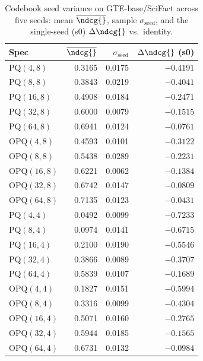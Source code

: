 \begin{table}[t]
\centering
\small
\caption{Codebook seed variance on GTE-base/SciFact across five seeds: mean $\overline{\ndcg{}}$, sample $\sigma_{\text{seed}}$, and the single-seed (s0) $\Delta\ndcg{}$ vs.\ identity.}
\label{tab:seed-variance-gte-base-scifact}
\begin{tabular}{lrrr}
\toprule
Spec & $\overline{\ndcg{}}$ & $\sigma_{\text{seed}}$ & $\Delta\ndcg{}$ (s0) \\
\midrule
PQ$(4,8)$ & 0.3165 & 0.0175 & $-0.4191$ \\
PQ$(8,8)$ & 0.3843 & 0.0219 & $-0.4041$ \\
PQ$(16,8)$ & 0.4908 & 0.0184 & $-0.2471$ \\
PQ$(32,8)$ & 0.6000 & 0.0079 & $-0.1515$ \\
PQ$(64,8)$ & 0.6941 & 0.0124 & $-0.0761$ \\
OPQ$(4,8)$ & 0.4593 & 0.0101 & $-0.3122$ \\
OPQ$(8,8)$ & 0.5438 & 0.0289 & $-0.2231$ \\
OPQ$(16,8)$ & 0.6221 & 0.0062 & $-0.1384$ \\
OPQ$(32,8)$ & 0.6742 & 0.0147 & $-0.0809$ \\
OPQ$(64,8)$ & 0.7135 & 0.0123 & $-0.0431$ \\
PQ$(4,4)$ & 0.0492 & 0.0099 & $-0.7233$ \\
PQ$(8,4)$ & 0.0974 & 0.0141 & $-0.6715$ \\
PQ$(16,4)$ & 0.2100 & 0.0190 & $-0.5546$ \\
PQ$(32,4)$ & 0.3866 & 0.0089 & $-0.3707$ \\
PQ$(64,4)$ & 0.5839 & 0.0107 & $-0.1689$ \\
OPQ$(4,4)$ & 0.1827 & 0.0151 & $-0.5994$ \\
OPQ$(8,4)$ & 0.3316 & 0.0099 & $-0.4304$ \\
OPQ$(16,4)$ & 0.5071 & 0.0160 & $-0.2765$ \\
OPQ$(32,4)$ & 0.5944 & 0.0185 & $-0.1565$ \\
OPQ$(64,4)$ & 0.6731 & 0.0132 & $-0.0984$ \\
\bottomrule
\end{tabular}
\end{table}

